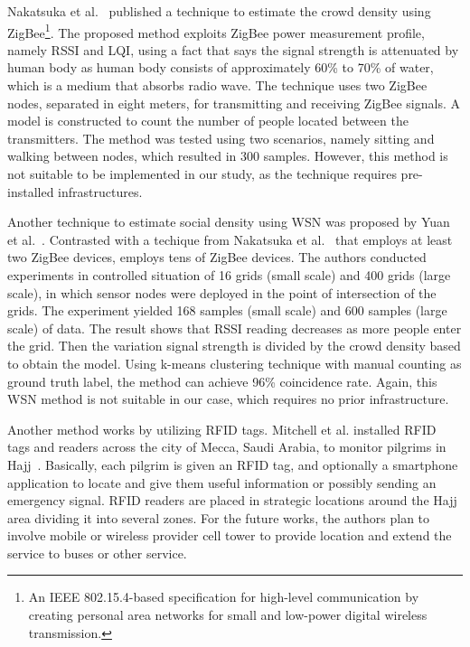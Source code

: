 	Nakatsuka et al.~\cite{thesis042} published a technique to estimate the crowd density using ZigBee\footnote{An IEEE 802.15.4-based specification for high-level communication by creating personal area networks for small and low-power digital wireless transmission.}. The proposed method exploits ZigBee power measurement profile, namely \ac{RSSI} and \ac{LQI}, using a fact that says the signal strength is attenuated by human body as human body consists of approximately 60\% to 70\% of water, which is a medium that absorbs radio wave. The technique uses two ZigBee nodes, separated in eight meters, for transmitting and receiving ZigBee signals. A model is constructed to count the number of people located between the transmitters. The method was tested using two scenarios, namely sitting and walking between nodes, which resulted in 300 samples. However, this method is not suitable to be implemented in our study, as the technique requires pre-installed infrastructures.
	
	Another technique to estimate social density using \ac{WSN} was proposed by Yuan et al.~\cite{thesis043}. Contrasted with a techique from Nakatsuka et al.~\cite{thesis042} that employs at least two ZigBee devices, \cite{thesis043} employs tens of ZigBee devices.
	The authors conducted experiments in controlled situation of 16 grids (small scale) and 400 grids (large scale), in which sensor nodes were deployed in the point of intersection of the grids. The experiment yielded 168 samples (small scale) and 600 samples (large scale) of data. The result shows that \ac{RSSI} reading decreases as more people enter the grid. Then the variation signal strength is divided by the crowd density based to obtain the model. Using k-means clustering technique with manual counting as ground truth label, the method can achieve 96\% coincidence rate. Again, this WSN method is not suitable in our case, which requires no prior infrastructure.


	Another method works by utilizing \ac{RFID} tags. Mitchell et al. installed \ac{RFID} tags and readers across the city of Mecca, Saudi Arabia, to monitor pilgrims in Hajj~\cite{thesis050}. Basically, each pilgrim is given an \ac{RFID} tag, and optionally a smartphone application to locate and give them useful information or possibly sending an emergency signal. \ac{RFID} readers are placed in strategic locations around the Hajj area dividing it into several zones. For the future works, the authors plan to involve mobile or wireless provider cell tower to provide location and extend the service to buses or other service.









